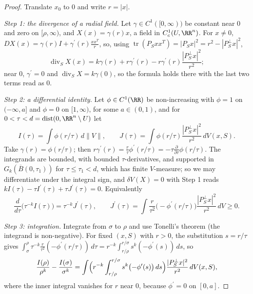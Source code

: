 \begin{proof}
Translate $x_0$ to $0$ and write $r = |x|$.

\emph{Step 1: the divergence of a radial field.} Let $\gamma \in C^1([0, \infty))$ be constant near $0$ and zero on $[\rho, \infty)$, and $X(x) = \gamma(r)x$, a field in $C^1_c(U, \RR^n)$. For $x \neq 0$,
$DX(x) = \gamma(r)I + \gamma^{\prime}(r)\frac{xx^T}r$, so, using $\operatorname{tr}(P_Sxx^T) = |P_Sx|^2 = r^2 - |P_S^\perp x|^2$,
\[
\operatorname{div}_SX(x) = k\gamma(r) + r\gamma^{\prime}(r) - r\gamma^{\prime}(r)\frac{|P_S^\perp x|^2}{r^2};
\]
near $0$, $\gamma^{\prime} = 0$ and $\operatorname{div}_SX = k\gamma(0)$, so the formula holds there with the last two terms read as $0$.

\emph{Step 2: a differential identity.} Let $\phi \in C^1(\RR)$ be non-increasing with $\phi = 1$ on $(-\infty, a]$ and $\phi = 0$ on $[1, \infty)$, for some $a \in (0, 1)$, and for
$0 < \tau < d = \operatorname{dist}(0, \RR^n \setminus U)$ let
\[
I(\tau) = \int\phi(r/\tau)\,d\|V\|, \qquad J(\tau) = \int\phi(r/\tau)\frac{|P_S^\perp x|^2}{r^2}\,dV(x, S) .
\]
Take $\gamma(r) = \phi(r/\tau)$; then $r\gamma^{\prime}(r) = \frac r\tau\phi^{\prime}(r/\tau) = -\tau\frac{\partial}{\partial\tau}\phi(r/\tau)$. The integrands are bounded, with bounded $\tau$-derivatives, and supported
in $G_k(\overline{B}(0, \tau_1))$ for $\tau \leq \tau_1 < d$, which has finite $V$-measure; so we may differentiate under the integral sign, and $\delta V(X) = 0$ with Step 1 reads
$kI(\tau) - \tau I^{\prime}(\tau) + \tau J^{\prime}(\tau) = 0$. Equivalently
\[
\frac{d}{d\tau}\bigl(\tau^{-k}I(\tau)\bigr) = \tau^{-k}J^{\prime}(\tau), \qquad J^{\prime}(\tau) = \int\frac r{\tau^2}\bigl(-\phi^{\prime}(r/\tau)\bigr)\frac{|P_S^\perp x|^2}{r^2}\,dV \geq 0 .
\]

\emph{Step 3: integration.} Integrate from $\sigma$ to $\rho$ and use Tonelli's theorem (the integrand is non-negative). For fixed $(x, S)$ with $r > 0$, the substitution $s = r/\tau$ gives
$\int_\sigma^\rho\tau^{-k}\frac r{\tau^2}(-\phi^{\prime}(r/\tau))\,d\tau = r^{-k}\int_{r/\rho}^{r/\sigma}s^k(-\phi^{\prime}(s))\,ds$, so
\begin{equation}\label{varifolds:equation-monotonicity-smooth}
\frac{I(\rho)}{\rho^k} - \frac{I(\sigma)}{\sigma^k} = \int\Bigl(r^{-k}\int_{r/\rho}^{r/\sigma}s^k\bigl(-\phi^{\prime}(s)\bigr)\,ds\Bigr)\frac{|P_S^\perp x|^2}{r^2}\,dV(x, S),
\end{equation}
where the inner integral vanishes for $r$ near $0$, because $\phi^{\prime} = 0$ on $[0, a]$.


\end{proof}
